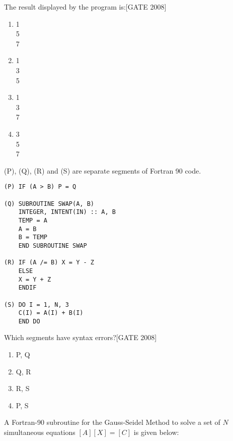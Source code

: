 The result displayed by the program is:\hfill{[GATE 2008]}

\begin{multicols}{4}
\begin{enumerate}
    \item 1 \\
          5 \\
          7
          \columnbreak
    \item 1 \\
          3 \\
          5
\columnbreak    \item 1 \\
          3 \\
          7
\columnbreak    \item 3 \\
          5 \\
          7
\end{enumerate}
\end{multicols}

\item (P), (Q), (R) and (S) are separate segments of Fortran 90 code.
\begin{center}
    \begin{verbatim}
(P) IF (A > B) P = Q

(Q) SUBROUTINE SWAP(A, B)
    INTEGER, INTENT(IN) :: A, B
    TEMP = A
    A = B
    B = TEMP
    END SUBROUTINE SWAP

(R) IF (A /= B) X = Y - Z
    ELSE
    X = Y + Z
    ENDIF

(S) DO I = 1, N, 3
    C(I) = A(I) + B(I)
    END DO
   \end{verbatim}
  
\end{center}
    




Which segments have syntax errors?\hfill{[GATE 2008]}
\begin{multicols}{4}
\begin{enumerate}
    \item P, Q
    \item Q, R
    \item R, S
    \item P, S
\end{enumerate}
\end{multicols}
    
     \item A Fortran-90 subroutine for the Gauss-Seidel Method to solve a set of \( N \) simultaneous equations \([A][X]=[C]\) is given below:

